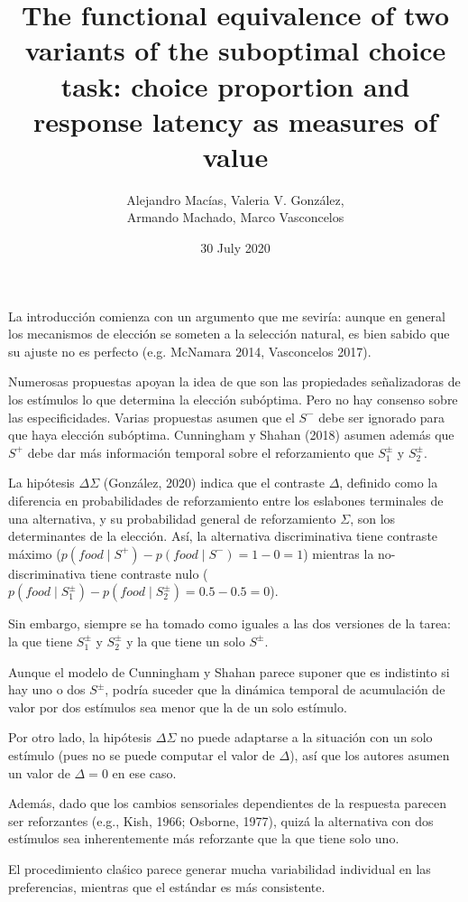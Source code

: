 \documentclass[a4paper,12pt]{article}
\title{The functional equivalence of two variants of the suboptimal choice task: choice proportion and response latency as measures of value}
\author{Alejandro Macías, Valeria V. González,\\Armando Machado, Marco Vasconcelos}
\date{30 July 2020}
\begin{document}
{\scshape\bfseries \maketitle}

La introducción comienza con un argumento que me seviría: aunque en general los mecanismos de elección se someten a la selección natural, es bien sabido que su ajuste no es perfecto (e.g. McNamara 2014, Vasconcelos 2017).

Numerosas propuestas apoyan la idea de que son las propiedades señalizadoras de los estímulos lo que determina la elección subóptima. Pero no hay consenso sobre las especificidades. Varias propuestas asumen que el $S^-$ debe ser ignorado para que haya elección subóptima. Cunningham y Shahan (2018) asumen además que $S^+$ debe dar más información temporal sobre el reforzamiento que $S^{\pm}_1$ y $S^{\pm}_2$.

La hipótesis $\Delta\Sigma$ (González, 2020) indica que el contraste $\Delta$, definido como la diferencia en probabilidades de reforzamiento entre los eslabones terminales de una alternativa, y su probabilidad general de reforzamiento $\Sigma$, son los determinantes de la elección. Así, la alternativa discriminativa tiene contraste máximo ($p(food\mid S^+)-p(food\mid S^-)=1-0=1$) mientras la no-discriminativa tiene contraste nulo ($p(food\mid S^\pm_1)-p(food\mid S^\pm_2)=0.5-0.5=0$).

Sin embargo, siempre se ha tomado como iguales a las dos versiones de la tarea: la que tiene $S^\pm_1$ y $S^\pm_2$ y la que tiene un solo $S^\pm$.

Aunque el modelo de Cunningham y Shahan parece suponer que es indistinto si hay uno o dos $S^\pm$, podría suceder que la dinámica temporal de acumulación de valor por dos estímulos sea menor que la de un solo estímulo.

Por otro lado, la hipótesis $\Delta\Sigma$ no puede adaptarse a la situación con un solo estímulo (pues no se puede computar el valor de $\Delta$), así que los autores asumen un valor de $\Delta=0$ en ese caso.

Además, dado que los cambios sensoriales dependientes de la respuesta parecen ser reforzantes (e.g., Kish, 1966; Osborne, 1977), quizá la alternativa con dos estímulos sea inherentemente más reforzante que la que tiene solo uno.

El procedimiento claśico parece generar mucha variabilidad individual en las preferencias, mientras que el estándar es más consistente.
\end{document}

